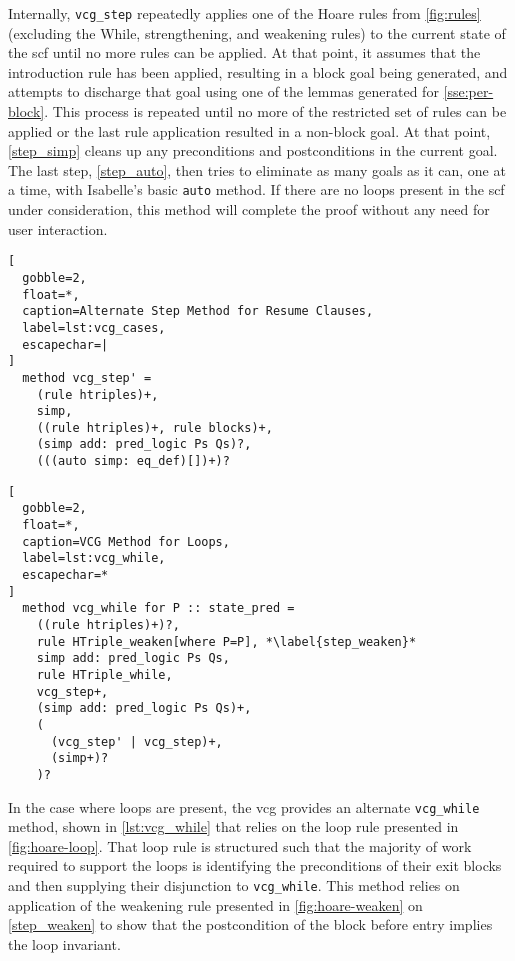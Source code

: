 Internally, \lstinline|vcg_step| repeatedly applies one of the Hoare rules
from \cref{fig:rules} (excluding the While, strengthening, and weakening rules)
to the current state of the \ac{scf} until no more rules can be applied.
At that point, it assumes that the introduction rule has been applied,
resulting in a block goal being generated, and attempts to discharge that goal
using one of the lemmas generated for \cref{sse:per-block}.
This process is repeated until no more of the restricted set of rules can be applied
or the last rule application resulted in a non-block goal.
At that point, \cref{step_simp} cleans up any preconditions and postconditions
in the current goal.
The last step, \cref{step_auto}, then tries to eliminate as many goals as it can,
one at a time, with Isabelle's basic \lstinline|auto| method.
If there are no loops present in the \ac{scf} under consideration,
this method will complete the proof without any need for user interaction.

\begin{lstlisting}[
  gobble=2,
  float=*,
  caption=Alternate Step Method for Resume Clauses,
  label=lst:vcg_cases,
  escapechar=|
]
  method vcg_step' =
    (rule htriples)+,
    simp,
    ((rule htriples)+, rule blocks)+,
    (simp add: pred_logic Ps Qs)?,
    (((auto simp: eq_def)[])+)?
\end{lstlisting}
\begin{lstlisting}[
  gobble=2,
  float=*,
  caption=VCG Method for Loops,
  label=lst:vcg_while,
  escapechar=*
]
  method vcg_while for P :: state_pred =
    ((rule htriples)+)?,
    rule HTriple_weaken[where P=P], *\label{step_weaken}*
    simp add: pred_logic Ps Qs,
    rule HTriple_while,
    vcg_step+,
    (simp add: pred_logic Ps Qs)+,
    (
      (vcg_step' | vcg_step)+,
      (simp+)?
    )?
\end{lstlisting}
In the case where loops are present,
the \ac{vcg} provides an alternate \lstinline|vcg_while| method,
shown in \cref{lst:vcg_while}
that relies on the loop rule presented in \cref{fig:hoare-loop}.
That loop rule is structured such that
the majority of work required to support the loops
is identifying the preconditions of their exit blocks
and then supplying their disjunction to \lstinline|vcg_while|.
This method relies on application of the weakening rule
presented in \cref{fig:hoare-weaken} on \cref{step_weaken}
to show that the postcondition of the block before entry implies the loop invariant.

